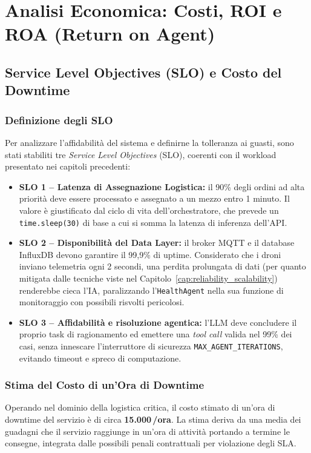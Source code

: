 
\chapter{Analisi Economica: Costi, ROI e ROA (Return on Agent)}
\label{cap:analisi_economica}

\section{Service Level Objectives (SLO) e Costo del Downtime}
\label{sec:slo_downtime}

\subsection*{Definizione degli SLO}
Per analizzare l'affidabilità del sistema e definirne la tolleranza ai guasti, sono stati stabiliti tre \textit{Service Level Objectives} (SLO), coerenti con il workload presentato nei capitoli precedenti:

\begin{itemize}
    \item \textbf{SLO 1 -- Latenza di Assegnazione Logistica:} il 90\% degli ordini ad alta priorità deve essere processato e assegnato a un mezzo entro 1 minuto. Il valore è giustificato dal ciclo di vita dell'orchestratore, che prevede un \texttt{time.sleep(30)} di base a cui si somma la latenza di inferenza dell'API.
    \item \textbf{SLO 2 -- Disponibilità del Data Layer:} il broker MQTT e il database InfluxDB devono garantire il 99{,}9\% di uptime. Considerato che i droni inviano telemetria ogni 2 secondi, una perdita prolungata di dati (per quanto mitigata dalle tecniche viste nel Capitolo~\ref{cap:reliability_scalability}) renderebbe cieca l'IA, paralizzando l'\texttt{HealthAgent} nella sua funzione di monitoraggio con possibili risvolti pericolosi.
    \item \textbf{SLO 3 -- Affidabilità e risoluzione agentica:} l'LLM deve concludere il proprio task di ragionamento ed emettere una \textit{tool call} valida nel 99\% dei casi, senza innescare l'interruttore di sicurezza \texttt{MAX\_AGENT\_ITERATIONS}, evitando timeout e spreco di computazione.
\end{itemize}

\subsection*{Stima del Costo di un'Ora di Downtime}
Operando nel dominio della logistica critica, il costo stimato di un'ora di downtime del servizio è di circa \textbf{15.000\,\texteuro/ora}. La stima deriva da una media dei guadagni che il servizio raggiunge in un'ora di attività portando a termine le consegne, integrata dalle possibili penali contrattuali per violazione degli SLA.

